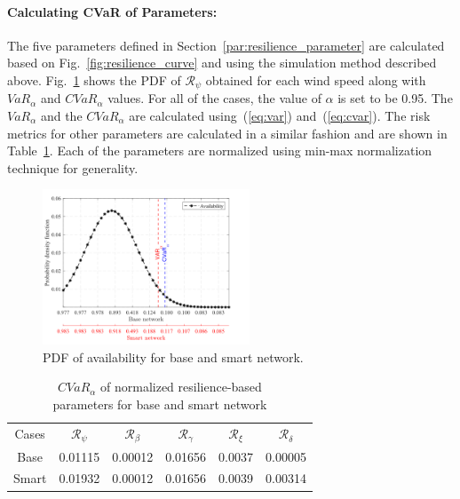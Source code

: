 \paragraph{Calculating CVaR of Parameters:}
The five parameters defined in Section~\ref{par:resilience_parameter} are calculated based on Fig.~\ref{fig:resilience_curve} and using the simulation method described above. Fig.~\ref{fig:availability} shows the PDF of $\mathcal{R}_\psi$ obtained for each wind speed along with $VaR_\alpha$ and $CVaR_\alpha$ values. For all of the cases, the value of $\alpha$ is set to be 0.95. The $VaR_\alpha$ and the $CVaR_\alpha$ are calculated using~(\ref{eq:var}) and~(\ref{eq:cvar}). The risk metrics for other parameters are calculated in a similar fashion and are shown in Table~\ref{tab:CVAR}. Each of the parameters are normalized using min-max normalization technique for generality.  

\begin{figure}
    \centering
    \includegraphics[trim=0cm 0.3cm 1.45cm 0.5cm,clip,width=0.55\textwidth]{figures/Availability.png}
    \vspace{-5pt}
    \caption{PDF of availability for base and smart network.}
    \label{fig:availability}
\end{figure}


\begin{table}[h]
    \centering
    \caption{$CVaR_\alpha$ of normalized resilience-based \\ parameters for base and smart network}
    \begin{tabular}{c|c|c|c|c|c}
    \hline
          Cases & $\mathcal{R}_\psi$ & $\mathcal{R}_\beta$ & $\mathcal{R}_\gamma$ & $\mathcal{R}_\xi$ & $\mathcal{R}_\delta$  \\
    \hhline{======}
         Base & 0.01115 & 0.00012 & 0.01656 & 0.0037 & 0.00005 \\
    \hline
         Smart & 0.01932 & 0.00012 & 0.01656 & 0.0039 & 0.00314 \\ 
    \hline
    \end{tabular}
    \label{tab:CVAR}
\end{table}



